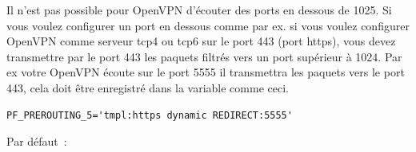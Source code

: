 \begin{description}
  Il n'est pas possible pour OpenVPN d'écouter des ports en dessous de 1025. Si vous voulez
  configurer un port en dessous comme par ex. si vous voulez configurer OpenVPN comme
  serveur tcp4 ou tcp6 sur le port 443 (port https), vous devez transmettre par le port 443 les
  paquets filtrés vers un port supérieur à 1024. Par ex votre OpenVPN écoute sur le port
  5555 il transmettra les paquets vers le port 443, cela doit être enregistré dans la
  variable  comme ceci.

\begin{example}
\begin{verbatim}
PF_PREROUTING_5='tmpl:https dynamic REDIRECT:5555'
\end{verbatim}
\end{example}


  Par défaut~: 


\end{description}

